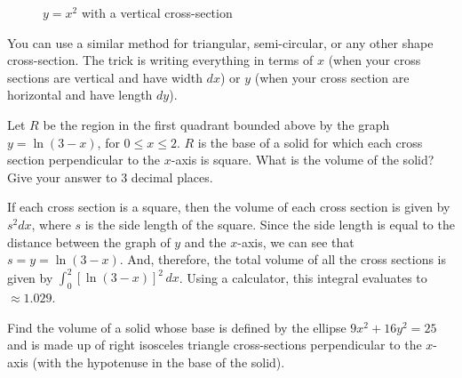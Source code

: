 \begin{figure}[H]
\centering
	\caption{$y = x^2$ with a vertical cross-section}
	\label{fig:parab} 
\end{figure}

You can use a similar method for triangular, semi-circular, or any other shape 
cross-section. The trick is writing everything in terms of $x$ (when your cross 
sections are vertical and have width $dx$) or $y$ (when your cross section are 
horizontal and have length $dy$). 

\begin{Exercise} Let $R$ be the region in the first 
quadrant bounded above by the graph $y = \ln{(3 - x)}$, for $0 \leq x \leq 2$. 
$R$ is the base of a solid for which each cross section perpendicular to the 
$x$-axis is square. What is the volume of the solid? Give your answer to 3 
decimal places. 
\end{Exercise}

\begin{Answer}[ref=AP_87]
If each cross section is a square, then the volume of each cross section is 
given by $s^2 dx$, where $s$ is the side length of the square. Since the side 
length is equal to the distance between the graph of $y$ and the $x$-axis, we 
can see that $s = y = \ln{(3 - x)}$. And, therefore, the total volume of all 
the cross sections is given by $\int_0^2 \left[\ln{(3 - x)} \right]^2\,dx$. 
Using a calculator, this integral evaluates to $\approx 1.029$. 
\end{Answer}

\begin{Exercise}[label = volume6]
Find the volume of a solid whose base is defined by the ellipse $9x^2 + 16y^2 =
25$ and is made up of right isosceles triangle cross-sections perpendicular to the 
$x$-axis (with the hypotenuse in the base of the solid). 
\end{Exercise}

